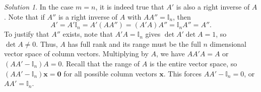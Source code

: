 \documentclass[11pt]{report}
\renewcommand\vec\boldsymbol
\def\vx{\vec{x}}
\theoremstyle{remark}
\newtheorem*{solution}{Solution}
\begin{document}
\begin{solution}
        In the case $m = n$, it is indeed true that $A'$ is also a right inverse of
        $A$. Note that if $A''$ is a right inverse of $A$ with $A A'' =
        \mathbb{I}_n$, then \[
            A' = A'\mathbb{I}_n = A'(A A'') = (A' A) A'' = \mathbb{I}_n A'' = A''.
        \] To justify that $A''$ exists, note that $A'A = \mathbb{I}_n$ gives
        $\det{A'}\det{A} = 1$, so $\det{A} \neq 0$. Thus, $A$ has full rank and its
        range must be the full $n$ dimensional vector space of column vectors.
        Multiplying by $A$, we have $A A' A = A$ or $(A A' - \mathbb{I}_n) A = 0$.
        Recall that the range of $A$ is the entire vector space, so $(A A' -
        \mathbb{I}_n)\vx = \vec{0}$ for all possible column vectors $\vx$. This
        forces $A A' - \mathbb{I}_n = 0$, or $A A' = \mathbb{I}_n$.
    \end{solution}
\end{document}
